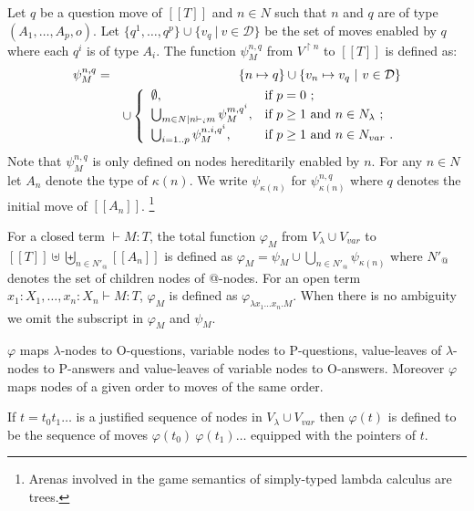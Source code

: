 \documentclass{llncs}
\newcommand\union{\cup}
\newcommand\Union{\bigcup}
\newcommand{\sem}[1]{{[\![ #1 ]\!]}}
\begin{document}
\begin{definition}\rm
\label{def:phi_psi mapping}
Let $q$ be a question move of $\sem{T}$ and $n \in N$ such that $n$
and $q$ are of type $(A_1,\ldots,A_p,o)$.  Let $\{ q^1, \ldots, q^p \}
\union \{ v_q \ | \ v \in \mathcal{D} \}$ be the set of moves enabled
by $q$ where each $q^i$ is of type $A_i$. The function $\psi_M^{n,q}$
from $V^{\upharpoonright n}$ to $\sem{T}$ is defined as:
\begin{eqnarray*}
\psi^{n,q}_M &=& \{ n \mapsto q \} \union  \{ v_n \mapsto v_q \ | \ v \in \mathcal{D} \}\\
 &&\union \left\{
                \begin{array}{ll}
                  \emptyset, & \hbox{if $p=0$\ ;} \\
                  \Union_{m \in N | n \vdash_i m} \psi_M^{m, q^i}, & \hbox{if $p\geq1$ and $n\in N_{\lambda}$\ ;} \\
                  \Union_{i=1..p} \psi_M^{n.i, q^i}, & \hbox{if $p\geq1$ and $n\in N_{var}$\ .}
                \end{array}
              \right.
\end{eqnarray*}
Note that $\psi_M^{n,q}$ is only defined on nodes hereditarily enabled
by $n$.  For any $n \in N$ let $A_n$ denote the type of
$\kappa(n)$. We write $\psi_{\kappa(n)}$ for $\psi_{\kappa(n)}^{n,q}$
where $q$ denotes the initial move of $\sem{A_n}$. \footnote{Arenas
involved in the game semantics of simply-typed lambda calculus are
trees.}


For a closed term $\vdash M : T$, the total function $\varphi_M$ from
$V_\lambda \union V_{var}$ to $\sem{T} \uplus \biguplus_{n \in N'_@}
\sem{A_n}$ is defined as $\varphi_M = \psi_M \union \Union_{n \in
N'_@} \psi_{\kappa(n)}$ where $N'_@$ denotes the set of children nodes
of @-nodes.  For an open term $x_1 : X_1, \ldots, x_n : X_n \vdash M :
T$, $\varphi_M$ is defined as $\varphi_{\lambda x_1 \ldots x_n
. M}$. When there is no ambiguity we omit the subscript in $\varphi_M$
and $\psi_M$.
\end{definition}
\begin{remark}
$\varphi$ maps $\lambda$-nodes to O-questions, variable nodes to
P-questions, value-leaves of $\lambda$-nodes to P-answers and
value-leaves of variable nodes to O-answers.
Moreover $\varphi$ maps nodes of a given order to moves of the same order.
\end{remark}
If $t = t_0 t_1 \ldots$ is a justified sequence
of nodes in $V_\lambda \union V_{var}$ then $\varphi(t)$ is defined
to be the sequence of moves $\varphi(t_0)\ \varphi(t_1) \ldots$
equipped with the pointers of $t$.
\end{document}
